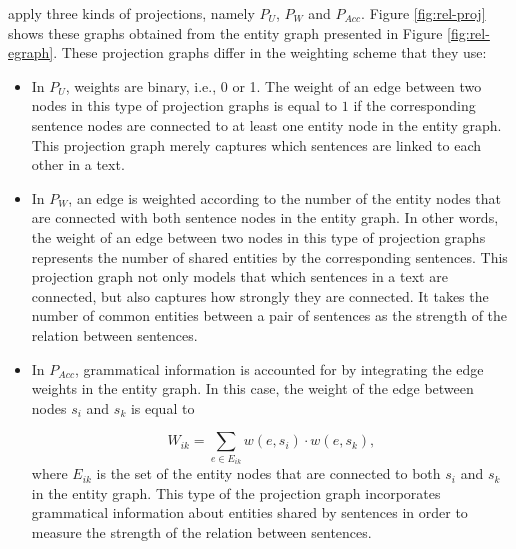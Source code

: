  apply three kinds of projections, namely $P_U$, $P_W$ and $P_{Acc}$. 
Figure \ref{fig:rel-proj} shows these graphs obtained from the entity graph presented in Figure \ref{fig:rel-egraph}. 
These projection graphs differ in the weighting scheme that they use: 

\begin{itemize}

	\item In $P_U$, weights are binary, i.e., 0 or 1. 
	The weight of an edge between two nodes in this type of projection graphs is equal to $1$ if the corresponding sentence nodes are connected to at least one entity node in the entity graph.  
	This projection graph merely captures which sentences are linked to each other in a text. 

	\item In $P_W$, an edge is weighted according to the number of the entity nodes that are connected with both sentence nodes in the entity graph. 
    In other words, the weight of an edge between two nodes in this type of projection graphs represents the number of shared entities by the corresponding sentences. 
    This projection graph not only models that which sentences in a text are connected,  but also captures how strongly they are connected. 
    It takes the number of common entities between a pair of sentences as the strength of the relation between sentences. 

	\item In $P_{Acc}$, grammatical information is accounted for by integrating the edge weights in the entity graph. 
	In this case, the weight of the edge between nodes $s_i$ and $s_k$ is equal to

	\begin{equation}
		W_{ik} = \sum_{e \in E_{ik}}{w(e,s_i) \cdot w(e,s_k)},
	\end{equation}
	where $E_{ik}$ is the set of the entity nodes that are connected to both $s_i$ and $s_k$ in the entity graph.   
	This type of the projection graph incorporates grammatical information about entities shared by sentences in order to measure the strength of the relation between sentences. 

\end{itemize}


